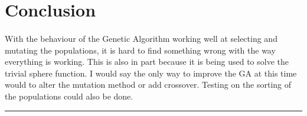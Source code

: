 \documentclass[paper=a4, fontsize=11pt]{scrartcl} %
\numberwithin{equation}{section} %
\numberwithin{figure}{section} %
\numberwithin{table}{section} %
\newcommand{\horrule}[1]{\rule{\linewidth}{#1}} %
\begin{document}
\section{Conclusion}

\paragraph{} With the behaviour of the Genetic Algorithm working well at selecting and mutating the populations, it is hard to find something wrong with the way everything is working. This is also in part because it is being used to solve the trivial sphere function. I would say the only way to improve the GA at this time would to alter the mutation method or add crossover. Testing on the sorting of the populations could also be done.

\horrule{0.5pt} \\[0.4cm] %
\end{document}
